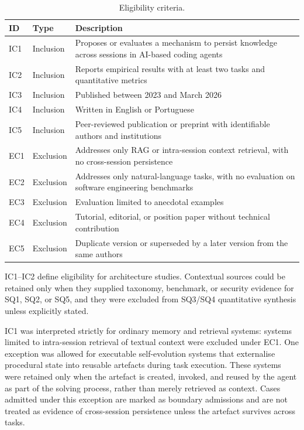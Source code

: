 \begin{table}[htbp]
  \centering
  \caption{Eligibility criteria.}
  \label{tab:criteria}
  \begin{tabularx}{\textwidth}{l l X}
    \toprule
    ID  & Type & Description \\
    \midrule
    IC1 & Inclusion & Proposes or evaluates a mechanism to persist
      knowledge across sessions in AI-based coding agents \\
    IC2 & Inclusion & Reports empirical results with at least two
      tasks and quantitative metrics \\
    IC3 & Inclusion & Published between 2023 and March 2026 \\
    IC4 & Inclusion & Written in English or Portuguese \\
    IC5 & Inclusion & Peer-reviewed publication or preprint with
      identifiable authors and institutions \\
    \midrule
    EC1 & Exclusion & Addresses only RAG or intra-session context
      retrieval, with no cross-session persistence \\
    EC2 & Exclusion & Addresses only natural-language tasks, with no
      evaluation on software engineering benchmarks \\
    EC3 & Exclusion & Evaluation limited to anecdotal examples \\
    EC4 & Exclusion & Tutorial, editorial, or position paper without
      technical contribution \\
    EC5 & Exclusion & Duplicate version or superseded by a later
      version from the same authors \\
    \bottomrule
  \end{tabularx}
\end{table}

IC1--IC2 define eligibility for architecture studies.
Contextual sources could be retained only when they supplied taxonomy,
benchmark, or security evidence for SQ1, SQ2, or SQ5, and they were
excluded from SQ3/SQ4 quantitative synthesis unless explicitly stated.

IC1 was interpreted strictly for ordinary memory and retrieval systems:
systems limited to intra-session retrieval of textual context were
excluded under EC1.
One exception was allowed for executable self-evolution systems that
externalise procedural state into reusable artefacts during task
execution.
These systems were retained only when the artefact is created, invoked,
and reused by the agent as part of the solving process, rather than
merely retrieved as context.
Cases admitted under this exception are marked as boundary admissions
and are not treated as evidence of cross-session persistence unless the
artefact survives across tasks.

